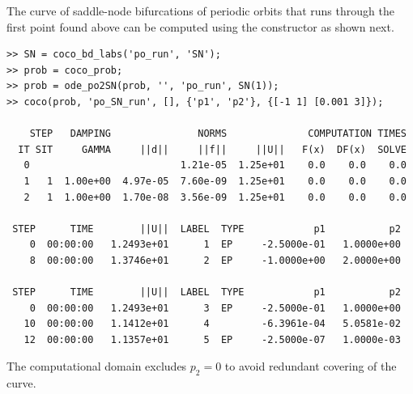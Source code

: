 The curve of saddle-node bifurcations of periodic orbits that runs through the first  point found above can be computed using the  constructor as shown next.
\begin{lstlisting}[language=coco-highlight,frame=lines]
>> SN = coco_bd_labs('po_run', 'SN');
>> prob = coco_prob;
>> prob = ode_po2SN(prob, '', 'po_run', SN(1));
>> coco(prob, 'po_SN_run', [], {'p1', 'p2'}, {[-1 1] [0.001 3]});

    STEP   DAMPING               NORMS              COMPUTATION TIMES
  IT SIT     GAMMA     ||d||     ||f||     ||U||   F(x)  DF(x)  SOLVE
   0                          1.21e-05  1.25e+01    0.0    0.0    0.0
   1   1  1.00e+00  4.97e-05  7.60e-09  1.25e+01    0.0    0.0    0.0
   2   1  1.00e+00  1.70e-08  3.56e-09  1.25e+01    0.0    0.0    0.0

 STEP      TIME        ||U||  LABEL  TYPE            p1           p2
    0  00:00:00   1.2493e+01      1  EP     -2.5000e-01   1.0000e+00
    8  00:00:00   1.3746e+01      2  EP     -1.0000e+00   2.0000e+00

 STEP      TIME        ||U||  LABEL  TYPE            p1           p2
    0  00:00:00   1.2493e+01      3  EP     -2.5000e-01   1.0000e+00
   10  00:00:00   1.1412e+01      4         -6.3961e-04   5.0581e-02
   12  00:00:00   1.1357e+01      5  EP     -2.5000e-07   1.0000e-03
\end{lstlisting}
The computational domain excludes $p_2=0$ to avoid redundant covering of the curve. 

